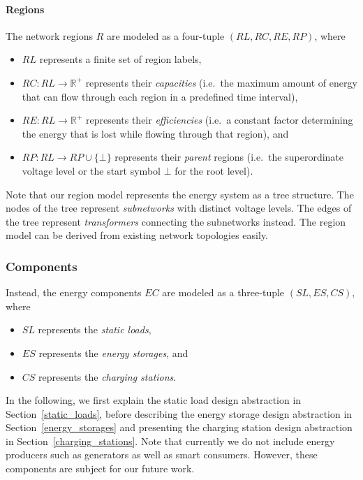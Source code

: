 \paragraph{Regions}
\label{regions}

The network regions $R$ are modeled as a four-tuple $(RL, RC, RE, RP)$, where
\begin{itemize}
	\item $RL$ represents a finite set of region labels,
	\item $RC: RL \rightarrow \mathbb{R}^+$ represents their \textit{capacities} (i.e.\ the maximum amount of energy that can flow through each region in a predefined time interval),
	\item $RE: RL \rightarrow \mathbb{R}^+$ represents their \textit{efficiencies} (i.e.\ a constant factor determining the energy that is lost while flowing through that region), and
	\item $RP: RL \rightarrow RP \cup \{\bot\}$ represents their \textit{parent} regions (i.e.\ the superordinate voltage level or the start symbol $\bot$ for the root level).
\end{itemize}
Note that our region model represents the energy system as a tree structure. The nodes of the tree represent \textit{subnetworks} with distinct voltage levels. The edges of the tree represent \textit{transformers} connecting the subnetworks instead. The region model can be derived from existing network topologies easily.

\subsubsection{Components}
\label{components}

Instead, the energy components $EC$ are modeled as a three-tuple $(SL, ES, CS)$, where
\begin{itemize}
	\item $SL$ represents the \textit{static loads},
	\item $ES$ represents the \textit{energy storages}, and
	\item $CS$ represents the \textit{charging stations}.
\end{itemize}
In the following, we first explain the static load design abstraction in Section~\ref{static_loads}, before describing the energy storage design abstraction in Section~\ref{energy_storages} and presenting the charging station design abstraction in Section~\ref{charging_stations}. Note that currently we do not include energy producers such as generators as well as smart consumers. However, these components are subject for our future work.


